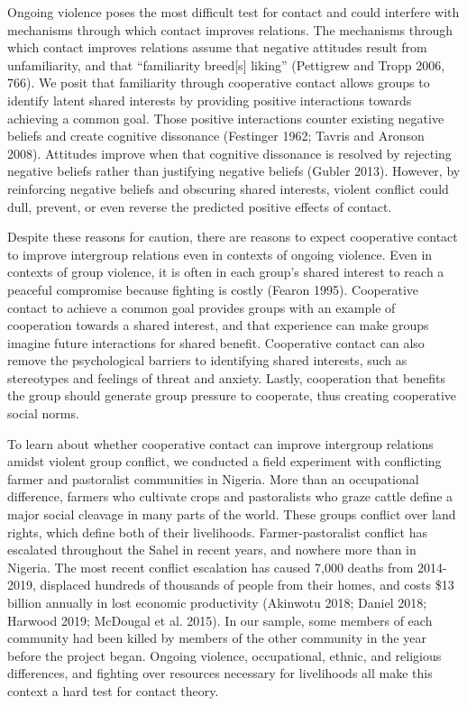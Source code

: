 \documentclass[11pt]{article}
\begin{document}
Ongoing violence poses the most difficult test for contact and could
interfere with mechanisms through which contact improves relations. The
mechanisms through which contact improves relations assume that negative
attitudes result from unfamiliarity, and that ``familiarity breed{[}s{]}
liking'' (Pettigrew and Tropp 2006, 766). We posit that familiarity
through cooperative contact allows groups to identify latent shared
interests by providing positive interactions towards achieving a common
goal. Those positive interactions counter existing negative beliefs and
create cognitive dissonance (Festinger 1962; Tavris and Aronson 2008).
Attitudes improve when that cognitive dissonance is resolved by
rejecting negative beliefs rather than justifying negative beliefs
(Gubler 2013). However, by reinforcing negative beliefs and obscuring
shared interests, violent conflict could dull, prevent, or even reverse
the predicted positive effects of contact.

Despite these reasons for caution, there are reasons to expect
cooperative contact to improve intergroup relations even in contexts of
ongoing violence. Even in contexts of group violence, it is often in
each group's shared interest to reach a peaceful compromise because
fighting is costly (Fearon 1995). Cooperative contact to achieve a
common goal provides groups with an example of cooperation towards a
shared interest, and that experience can make groups imagine future
interactions for shared benefit. Cooperative contact can also remove the
psychological barriers to identifying shared interests, such as
stereotypes and feelings of threat and anxiety. Lastly, cooperation that
benefits the group should generate group pressure to cooperate, thus
creating cooperative social norms.

To learn about whether cooperative contact can improve intergroup
relations amidst violent group conflict, we conducted a field experiment
with conflicting farmer and pastoralist communities in Nigeria. More
than an occupational difference, farmers who cultivate crops and
pastoralists who graze cattle define a major social cleavage in many
parts of the world. These groups conflict over land rights, which define
both of their livelihoods. Farmer-pastoralist conflict has escalated
throughout the Sahel in recent years, and nowhere more than in Nigeria.
The most recent conflict escalation has caused 7,000 deaths from
2014-2019, displaced hundreds of thousands of people from their homes,
and costs \$13 billion annually in lost economic productivity (Akinwotu
2018; Daniel 2018; Harwood 2019; McDougal et al. 2015). In our sample,
some members of each community had been killed by members of the other
community in the year before the project began. Ongoing violence,
occupational, ethnic, and religious differences, and fighting over
resources necessary for livelihoods all make this context a hard test
for contact theory.
\end{document}
